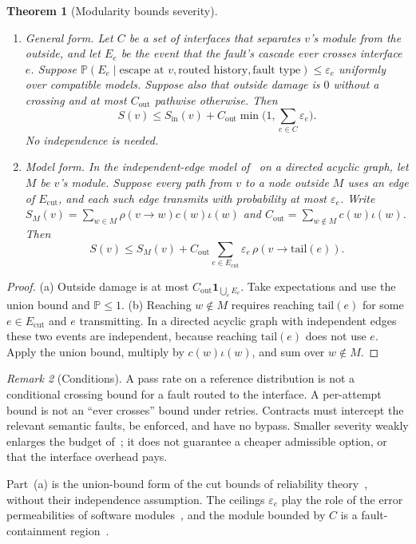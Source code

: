 \documentclass[11pt]{article}
\newtheorem{theorem}{Theorem}
\theoremstyle{definition}
\theoremstyle{remark}
\newtheorem{remark}[theorem]{Remark}
\newcommand{\Prb}{\mathbb P}
\newcommand{\ind}{\mathbf 1}
\begin{document}
\begin{theorem}[Modularity bounds severity]\label{thm:modularity}
\begin{enumerate}[label=(\alph*),itemsep=2pt]
\item \emph{General form.} Let $C$ be a set of interfaces that separates $v$'s module from the outside,
and let $E_e$ be the event that the fault's cascade ever crosses interface $e$. Suppose
$\Prb(E_e\mid\text{escape at }v,\text{routed history},\text{fault type})\le\varepsilon_e$ uniformly over
compatible models. Suppose also that outside damage is $0$ without a crossing and at most
$C_{\mathrm{out}}$ pathwise otherwise. Then
\[
S(v)\le S_{\mathrm{in}}(v)+C_{\mathrm{out}}\min\Big(1,\sum_{e\in C}\varepsilon_e\Big).
\]
No independence is needed.
\item \emph{Model form.} In the independent-edge model of~\cite{p6} on a directed acyclic graph, let $M$
be $v$'s module. Suppose every path from $v$ to a node outside $M$ uses an edge of $E_{\mathrm{cut}}$,
and each such edge transmits with probability at most $\varepsilon_e$. Write
$S_M(v)=\sum_{w\in M}\rho(v\to w)c(w)\iota(w)$ and $C_{\mathrm{out}}=\sum_{w\notin M}c(w)\iota(w)$. Then
\[
S(v)\le S_M(v)+C_{\mathrm{out}}\sum_{e\in E_{\mathrm{cut}}}\varepsilon_e\,\rho(v\to\mathrm{tail}(e)).
\]
\end{enumerate}
\end{theorem}
\begin{proof}
(a) Outside damage is at most $C_{\mathrm{out}}\ind_{\bigcup_eE_e}$. Take expectations and use the
union bound and $\Prb\le1$. (b) Reaching $w\notin M$ requires reaching $\mathrm{tail}(e)$ for some
$e\in E_{\mathrm{cut}}$ and $e$ transmitting. In a directed acyclic graph with independent edges these
two events are independent, because reaching $\mathrm{tail}(e)$ does not use $e$. Apply the union
bound, multiply by $c(w)\iota(w)$, and sum over $w\notin M$.
\end{proof}
\begin{remark}[Conditions]
A pass rate on a reference distribution is not a conditional crossing bound for a fault routed to the
interface. A per-attempt bound is not an ``ever crosses'' bound under retries. Contracts must
intercept the relevant semantic faults, be enforced, and have no bypass. Smaller severity weakly
enlarges the budget of~\cite{p6}; it does not guarantee a cheaper admissible option, or that the
interface overhead pays.
\end{remark}
Part~(a) is the union-bound form of the cut bounds of reliability theory~\cite{esary63}, without
their independence assumption. The ceilings $\varepsilon_e$ play the role of the error permeabilities
of software modules~\cite{hiller01,hiller04}, and the module bounded by $C$ is a fault-containment
region~\cite{lala94}.
\end{document}
